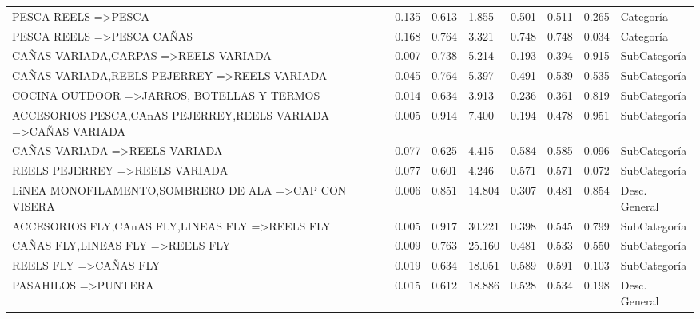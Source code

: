 \documentclass[]{article}
\begin{document}
\begin{landscape}
\begin{table}[htbp]
\begin{tabular}{llllllll}
				{PESCA REELS} =\textgreater {PESCA} & 0.135 & 0.613 & 1.855 & 0.501 & 0.511 & 0.265 & Categoría \\
				{PESCA REELS} =\textgreater {PESCA CAÑAS} & 0.168 & 0.764 & 3.321 & 0.748 & 0.748 & 0.034 & Categoría \\
				{CAÑAS VARIADA,CARPAS} =\textgreater {REELS VARIADA} & 0.007 & 0.738 & 5.214 & 0.193 & 0.394 & 0.915 & SubCategoría \\
				{CAÑAS VARIADA,REELS PEJERREY} =\textgreater {REELS VARIADA} & 0.045 & 0.764 & 5.397 & 0.491 & 0.539 & 0.535 & SubCategoría \\
				{COCINA OUTDOOR} =\textgreater {JARROS, BOTELLAS Y TERMOS} & 0.014 & 0.634 & 3.913 & 0.236 & 0.361 & 0.819 & SubCategoría \\
				{ACCESORIOS PESCA,CAnAS PEJERREY,REELS VARIADA} =\textgreater {CAÑAS VARIADA} & 0.005 & 0.914 & 7.400 & 0.194 & 0.478 & 0.951 & SubCategoría \\
				{CAÑAS VARIADA} =\textgreater {REELS VARIADA} & 0.077 & 0.625 & 4.415 & 0.584 & 0.585 & 0.096 & SubCategoría \\
				{REELS PEJERREY} =\textgreater {REELS VARIADA} & 0.077 & 0.601 & 4.246 & 0.571 & 0.571 & 0.072 & SubCategoría \\
				{LiNEA MONOFILAMENTO,SOMBRERO DE ALA} =\textgreater {CAP CON VISERA} & 0.006 & 0.851 & 14.804 & 0.307 & 0.481 & 0.854 & Desc. General \\
				{ACCESORIOS FLY,CAnAS FLY,LINEAS FLY} =\textgreater {REELS FLY} & 0.005 & 0.917 & 30.221 & 0.398 & 0.545 & 0.799 & SubCategoría \\
				{CAÑAS FLY,LINEAS FLY} =\textgreater {REELS FLY} & 0.009 & 0.763 & 25.160 & 0.481 & 0.533 & 0.550 & SubCategoría \\
				{REELS FLY} =\textgreater {CAÑAS FLY} & 0.019 & 0.634 & 18.051 & 0.589 & 0.591 & 0.103 & SubCategoría \\
				{PASAHILOS} =\textgreater {PUNTERA} & 0.015 & 0.612 & 18.886 & 0.528 & 0.534 & 0.198 & Desc. General \\		 			
			\end{tabular}%
			\label{Tab_Reg_Habituales}%
		\end{table}%
		
	\end{landscape}
	\restoregeometry
		
\end{document}
